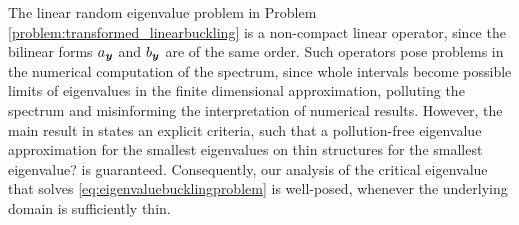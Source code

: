 \begin{remark} \label{remark:noncompactOperator}
The linear random eigenvalue problem in Problem \ref{problem:transformed_linearbuckling} is a non-compact linear operator, since the bilinear forms $a_{\boldsymbol{y}}$ and $b_{\boldsymbol{y}}$ are of the same order.
Such operators pose problems in the numerical computation of the spectrum, since whole intervals become possible limits of eigenvalues in the finite dimensional approximation, polluting the spectrum and misinforming the interpretation of numerical results. 
However, the main result in \cite[Theorem 5.1]{DaugeandSuriNumericalapproximation} states an explicit criteria, such that a pollution-free eigenvalue approximation for the smallest eigenvalues on thin structures \ac{for the smallest eigenvalue?} is guaranteed. 
Consequently, our analysis of the critical eigenvalue that solves \eqref{eq:eigenvaluebucklingproblem} is well-posed, whenever the underlying domain is sufficiently thin.
\end{remark}

